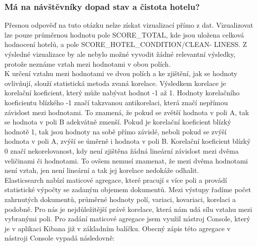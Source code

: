 \documentclass[czech,BP]{thesiskiv}
\begin{document}
\subsubsection{Má na návštěvníky dopad stav a čistota hotelu?}
\label{subsub:Stav a čistota}
Přesnou odpověď na tuto otázku nelze získat vizualizací přímo z dat. Vizualizovat lze pouze průměrnou hodnotu pole SCORE\_TOTAL, kde jsou uložena celková hodnocení hotelů, a pole SCORE\_HOTEL\_CONDITION/CLEAN- LINESS. Z výsledné vizualizace by ale nebylo možné vyvodit žádné relevantní výsledky, protože neznáme vztah mezi hodnotami v obou polích.
\\
K určení vztahu mezi hodnotami ve dvou polích a ke zjištění, jak se hodnoty ovlivňují, slouží statistická metoda zvaná korelace. Výsledkem korelace je korelační koeficient, který může nabývat hodnot -1 až 1. Hodnoty korelačního koeficientu blízkého -1 značí takzvanou antikorelaci, která značí nepřímou závislost mezi hodnotami. To znamená, že pokud se zvětší hodnota v poli A, tak se hodnota v poli B adekvátně zmenší. Pokud je korelační koeficient blízký hodnotě 1, tak jsou hodnoty na sobě přímo závislé, neboli pokud se zvýší hodnota v poli A, zvýší se úměrně i hodnota v poli B. Korelační koeficient blízký 0 značí nekorelovanost, kdy není zjištěna žádná lineární závislost mezi dvěma veličinami či hodnotami. To ovšem nemusí znamenat, že mezi dvěma hodnotami není vztah, jen není lineární a tak jej korelace nedokáže odhalit.\cite{Korelace}
\\
Elasticsearch nabízí maticové agregace, které pracují s více poli a provádí statistické výpočty se zadaným objemem dokumentů. Mezi výstupy řadíme počet zahrnutých dokumentů, průměrné hodnoty polí, variaci, kovariaci, korelaci a podobně. Pro nás je nejdůležitější právě korelace, která nám udá sílu vztahu mezi vybranými poli.\cite{MatrixAggs}
Pro zadání maticové agregace jsem využil nástroj Console, který je v aplikaci Kibana již v základním balíčku. Obecný zápis této agregace v nástroji Console vypadá následovně:
\end{document}
